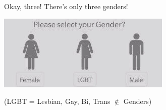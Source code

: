 \documentclass[aspectratio=169,x11names]{beamer}
\begin{document}
\begin{frame}
\begin{center}
\huge
Okay, three! There's only three genders!
\end{center}
\end{frame}

\begin{frame}
\begin{center}
\includegraphics[height=0.6\textheight,keepaspectratio]{images/gender_m_lgbt_f.jpg} 
\bigskip\Large

(LGBT = Lesbian, Gay, Bi, Trans $\notin$ Genders)
\end{center}
\end{frame}
\end{document}
